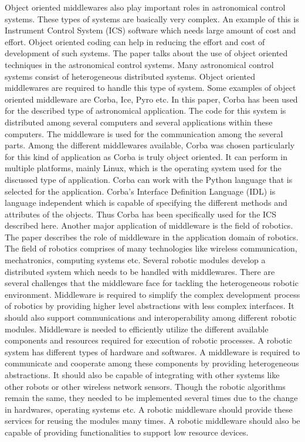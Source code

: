 \documentclass{acm_proc_article-sp}
\begin{document}
Object oriented middlewares also play important roles in astronomical control systems. These types of systems are basically very complex. An example of this is Instrument Control System (ICS) software which needs large amount of cost and effort. Object oriented coding can help in reducing the effort and cost of development of such systems. The paper \cite{Dipper:2004p565} talks about the use of object oriented techniques in the astronomical control systems. Many astronomical control systems consist of heterogeneous distributed systems. Object oriented middlewares are required to handle this type of system.
Some examples of object oriented middleware are Corba, Ice, Pyro etc. In this paper, Corba has been used for the described type of astronomical application. The code for this system is distributed among several computers and several applications within these computers. The middleware is used for the communication among the several parts. Among the different middlewares available, Corba was chosen particularly for this kind of application as Corba is truly object oriented. It can perform in multiple platforms, mainly Linux, which is the operating system used for the discussed type of application.  Corba can work with the Python language that is selected for the application. Corba’s Interface Definition Language (IDL) is language independent which is capable of specifying the different methods and attributes of the objects. Thus Corba has been specifically used for the ICS described here.
Another major application of middleware is the field of robotics. The paper \cites{Mohamed:2008p736} describes the role of middleware in the application domain of robotics. The field of robotics comprises of many technologies like wireless communication, mechatronics, computing systems etc. Several robotic modules develop a distributed system which needs to be handled with middlewares. There are several challenges that the middleware face for tackling the heterogeneous robotic environment. Middleware is required to simplify the complex development process of robotics by providing higher level abstractions with less complex interfaces. It should also support communications and interoperability among different robotic modules. Middleware is needed to efficiently utilize the different available components and resources required for execution of robotic processes. A robotic system has different types of hardware and softwares. A middleware is required to communicate and cooperate among these components by providing heterogeneous abstractions. It should also be capable of integrating with other systems like other robots or other wireless network sensors. Though the robotic algorithms remain the same, they needed to be implemented several times due to the change in hardwares, operating systems etc. A robotic middleware should provide these services for reusing the modules many times.  A robotic middleware should also be capable of providing functionalities to support low resource devices. 
\end{document}
